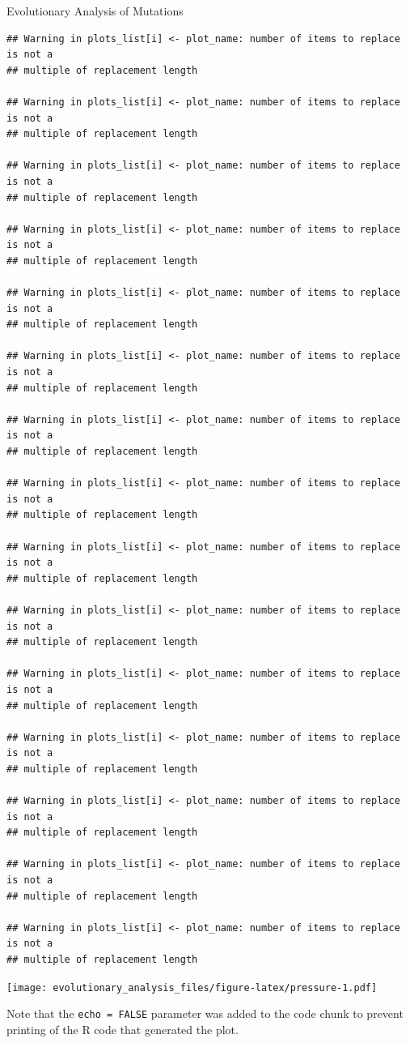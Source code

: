 \documentclass[]{article}
\begin{document}
Evolutionary Analysis of Mutations

\begin{verbatim}
## Warning in plots_list[i] <- plot_name: number of items to replace is not a
## multiple of replacement length

## Warning in plots_list[i] <- plot_name: number of items to replace is not a
## multiple of replacement length

## Warning in plots_list[i] <- plot_name: number of items to replace is not a
## multiple of replacement length

## Warning in plots_list[i] <- plot_name: number of items to replace is not a
## multiple of replacement length

## Warning in plots_list[i] <- plot_name: number of items to replace is not a
## multiple of replacement length

## Warning in plots_list[i] <- plot_name: number of items to replace is not a
## multiple of replacement length

## Warning in plots_list[i] <- plot_name: number of items to replace is not a
## multiple of replacement length

## Warning in plots_list[i] <- plot_name: number of items to replace is not a
## multiple of replacement length

## Warning in plots_list[i] <- plot_name: number of items to replace is not a
## multiple of replacement length

## Warning in plots_list[i] <- plot_name: number of items to replace is not a
## multiple of replacement length

## Warning in plots_list[i] <- plot_name: number of items to replace is not a
## multiple of replacement length

## Warning in plots_list[i] <- plot_name: number of items to replace is not a
## multiple of replacement length

## Warning in plots_list[i] <- plot_name: number of items to replace is not a
## multiple of replacement length

## Warning in plots_list[i] <- plot_name: number of items to replace is not a
## multiple of replacement length

## Warning in plots_list[i] <- plot_name: number of items to replace is not a
## multiple of replacement length
\end{verbatim}

\texttt{[image: evolutionary\_analysis\_files/figure-latex/pressure-1.pdf]}

Note that the \texttt{echo\ =\ FALSE} parameter was added to the code
chunk to prevent printing of the R code that generated the plot.
\end{document}

